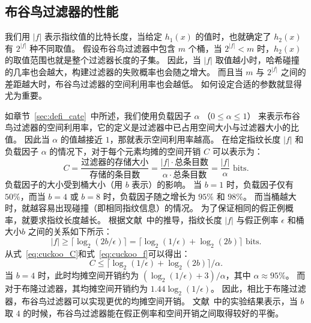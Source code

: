\subsection{布谷鸟过滤器的性能}

我们用 $|f|$ 表示指纹值的比特长度，当给定 $h_1(x)$ 的值时，也就确定了 $h_2(x)$ 有 $2^{|f|}$ 种不同取值。
假设布谷鸟过滤器中包含 $m$ 个桶，当 $2^{|f|} < m$ 时，$h_2(x)$ 的取值范围也就是整个过滤器长度的子集。
因此，当 $|f|$ 取值越小时，哈希碰撞的几率也会越大，构建过滤器的失败概率也会随之增大。
而且当 $m$ 与 $2^{|f|}$ 之间的差距越大时，布谷鸟过滤器的空间利用率也会越低。
如何设定合适的参数就显得尤为重要。


如章节~\ref{sec:defi_cate}~中所述，我们使用负载因子 $\alpha$ （$0\leq \alpha \leq 1$） 来表示布谷鸟过滤器的空间利用率，它的定义是过滤器中已占用空间大小与过滤器大小的比值。
因此当 $\alpha$ 的值越接近 $1$，那就表示空间利用率越高。
在给定指纹长度 $|f|$ 和负载因子 $\alpha$ 的情况下，对于每个元素均摊的空间开销 $C$ 可以表示为：
\begin{equation}
  C = \frac{\mbox{过滤器的存储大小}}{\mbox{存储的条目数}} = \frac{|f| \cdot \mbox{总条目数}}{\alpha \cdot \mbox{总条目数}} = \frac{|f|}{\alpha} \mbox{ bits}.
  \label{eq:cuckoo_C}
\end{equation}
负载因子的大小受到桶大小（用 $b$ 表示）的影响。
当 $b=1$ 时，负载因子仅有 $50\%$，而当 $b=4$ 或 $b=8$ 时，负载因子随之增长为 $95\%$ 和 $98\%$。
而当桶越大时，就越容易出现碰撞（即相同指纹信息）的情况。
为了保证相同的假正例概率，就要求指纹长度越长。
根据文献~\cite{fan2014cuckoo}中的推导，指纹长度 $|f|$ 与假正例率 $\epsilon$ 和桶大小$b$ 之间的关系如下所示：
\begin{equation}
  |f| \geq \lceil\log_2(2b / \epsilon) \rceil = \lceil \log_2(1/\epsilon) + \log_2(2b) \rceil \mbox{ bits}.
  \label{eq:cuckoo_f}
\end{equation}
从式~\ref{eq:cuckoo_C}和式~\ref{eq:cuckoo_f}可以得出：
\begin{equation}
  C \leq \lceil \log_2(1/\epsilon) + \log_2(2b) \rceil / \alpha.
  \label{eq:cuckoo_storage}
\end{equation}
当 $b=4$ 时，此时均摊空间开销约为 $(\log_2(1/\epsilon) + 3) / \alpha$，其中 $\alpha \approx 95\%$。
而对于布隆过滤器，其均摊空间开销约为 $1.44 \log_2(1/ \epsilon)$。
因此，相比于布隆过滤器，布谷鸟过滤器可以实现更优的均摊空间开销。
文献~\cite{fan2014cuckoo}中的实验结果表示，当 $b$ 取 $4$ 的时候，布谷鸟过滤器能在假正例率和空间开销之间取得较好的平衡。


